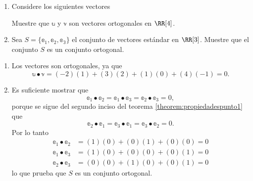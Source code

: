 \begin{examplebox}{}{}
    \begin{enumerate}[label=\roman*), topsep=6pt, itemsep=0pt]
        \item Considere los siguientes vectores
        \begin{matrizn}
        \end{matrizn}
        Muestre que $\mathbb{u}$ y $\mathbb{v}$ son vectores ortogonales en $\RR[4]$.
        \item Sea $S = \{\mathbb{e}_1, \mathbb{e}_2, \mathbb{e_3}\}$ el conjunto de vectores estándar en $\RR[3]$. Muestre que el conjunto $S$ es un conjunto ortogonal.
    \end{enumerate}

    \tcblower
    \solucion
    \begin{enumerate}[label=\roman*), topsep=6pt, itemsep=0pt]
        \item Los vectores son ortogonales, ya que
        $$\mathbb{u} \bullet \mathbb{v} = (-2)(1) + (3)(2) + (1)(0) + (4)(-1) = 0.$$
        \item Es suficiente mostrar que
        $$\mathbb{e}_1 \bullet \mathbb{e}_2 = \mathbb{e}_1 \bullet \mathbb{e}_3 = \mathbb{e}_2 \bullet \mathbb{e}_3 = 0,$$
        porque se sigue del segundo inciso del teorema \ref{theorem:propiedadespunto1} que
        $$\mathbb{e}_2 \bullet \mathbb{e}_1 = \mathbb{e}_3 \bullet \mathbb{e}_1 = \mathbb{e}_3 \bullet \mathbb{e}_2 = 0.$$
        Por lo tanto
        \begin{align*}
            \mathbb{e}_1 \bullet \mathbb{e}_2 & = (1)(0) + (0)(1) + (0)(0) = 0 \\
            \mathbb{e}_1 \bullet \mathbb{e}_3 & = (1)(0) + (0)(0) + (0)(1) = 0 \\
            \mathbb{e}_2 \bullet \mathbb{e}_3 & = (0)(0) + (1)(0) + (0)(1) = 0
        \end{align*}
        lo que prueba que $S$ es un conjunto ortogonal.
    \end{enumerate}
\end{examplebox}

